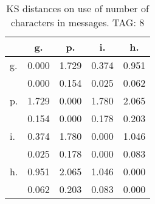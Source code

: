 \begin{table}[h!]
\begin{center}
\begin{tabular}{| l | c | c | c | c |}\hline
 & g. & p. & i. & h. \\\hline
g. & 0.000  & 1.729  & 0.374  & 0.951 \\\hline
 & 0.000  & 0.154  & 0.025  & 0.062 \\\hline
p. & 1.729  & 0.000  & 1.780  & 2.065 \\\hline
 & 0.154  & 0.000  & 0.178  & 0.203 \\\hline
i. & 0.374  & 1.780  & 0.000  & 1.046 \\\hline
 & 0.025  & 0.178  & 0.000  & 0.083 \\\hline
h. & 0.951  & 2.065  & 1.046  & 0.000 \\\hline
 & 0.062  & 0.203  & 0.083  & 0.000 \\\hline
\end{tabular}
\caption{KS distances on use of number of characters in messages. TAG: 8}
\end{center}
\end{table}